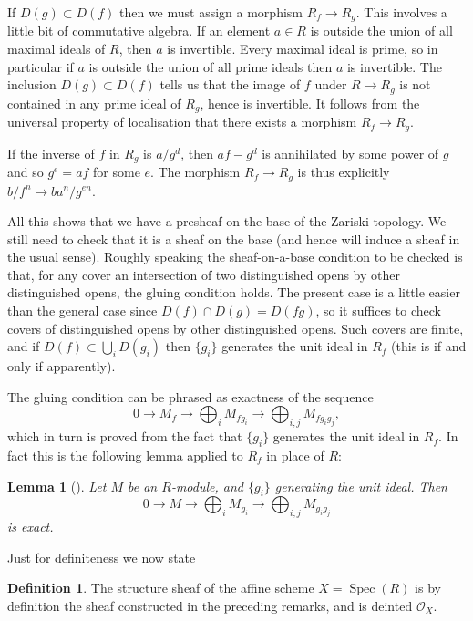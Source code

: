 \documentclass[12pt]{article}
\theoremstyle{plain}
\newtheorem{lemma}[thm]{Lemma}
\theoremstyle{definition}
\newtheorem{defn}{Definition}[section]
\numberwithin{equation}{section}
\DeclareMathOperator{\spec}{Spec}
\newcommand{\OO}{\mathcal{O}}
\begin{document}
If $D(g) \subset D(f)$ then we must assign a morphism $R_f \rightarrow R_g$. This involves a little bit of commutative algebra. If an element $a \in R$ is outside the union of all maximal ideals of $R$, then $a$ is invertible. Every maximal ideal is prime, so in particular if $a$ is outside the union of all prime ideals then $a$ is invertible. The inclusion $D(g) \subset D(f)$ tells us that the image of $f$ under $R \rightarrow R_g$ is not contained in any prime ideal of $R_g$, hence is invertible. It follows from the universal property of localisation that there exists a morphism $R_f \rightarrow R_g$.

If the inverse of $f$ in $R_g$ is $a / g^d$, then $a f - g^d$ is annihilated by some power of $g$ and so $g^e = af$ for some $e$. The morphism $R_f \rightarrow R_g$ is thus explicitly $b / f^n \mapsto b a^n / g^{en}$.

All this shows that we have a presheaf on the base of the Zariski topology. We still need to check that it is a sheaf on the base (and hence will induce a sheaf in the usual sense). Roughly speaking the sheaf-on-a-base condition to be checked is that, for any cover an intersection of two distinguished opens by other distinguished opens, the gluing condition holds. The present case is a little easier than the general case since $D(f) \cap D(g) = D(fg)$, so it suffices to check covers of distinguished opens by other distinguished opens. Such covers are finite, and if $D(f) \subset \bigcup_{i} D(g_i)$ then $\{g_i\}$ generates the unit ideal in $R_f$ (this is if and only if apparently).

The gluing condition can be phrased as exactness of the sequence
\[
0 \rightarrow M_f \rightarrow \bigoplus_i M_{fg_i} \rightarrow \bigoplus_{i, j} M_{fg_ig_j},
\]
which in turn is proved from the fact that $\{g_i\}$ generates the unit ideal in $R_f$. In fact this is the following lemma applied to $R_f$ in place of $R$:
\begin{lemma}[{\cite[Lemma 10.2.4]{stacks-project}}]
Let $M$ be an $R$-module, and $\{g_i\}$ generating the unit ideal. Then
\[
0 \rightarrow M \rightarrow \bigoplus_i M_{g_i} \rightarrow \bigoplus_{i, j} M_{g_ig_j}
\]
is exact.
\end{lemma}
Just for definiteness we now state
\begin{defn}
The structure sheaf of the affine scheme $X = \spec(R)$ is by definition the sheaf constructed in the preceding remarks, and is deinted $\OO_X$.
\end{defn}
\end{document}
